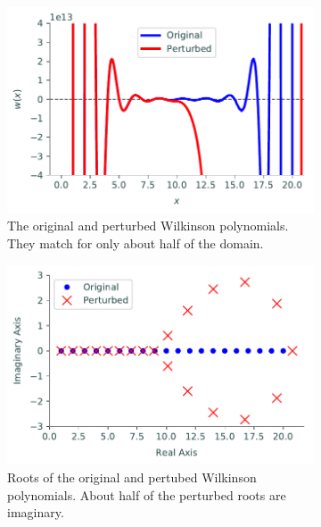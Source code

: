 \begin{figure}[H] %
\captionsetup[subfigure]{justification=centering}
\centering
\begin{subfigure}{.48\textwidth}
    \centering
    \includegraphics[width=\linewidth]{figures/perturbed_poly.pdf}
    \caption{The original and perturbed Wilkinson polynomials.
    They match for only about half of the domain.}
    \label{fig:wilkinson-perturbed-poly}
\end{subfigure}
\quad
\begin{subfigure}{.48\textwidth}
    \centering
    \includegraphics[width=\linewidth]{figures/perturbed_roots.pdf}
    \caption{Roots of the original and pertubed Wilkinson polynomials.
    About half of the perturbed roots are imaginary.}
    \label{fig:wilkinon-perturbed-roots}
\end{subfigure}
\caption{}
\label{fig:wilkinson-polynomial}
\end{figure}

